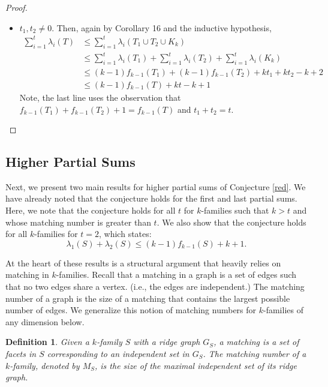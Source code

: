 \documentclass[11pt]{article}
\newtheorem{defi}[lm]{Definition}
\begin{document}
\begin{proof}
\begin{itemize}
\item[Case 2.] $t_1, t_2 \neq 0$. Then, again by Corollary 16 and the inductive hypothesis,
\begin{align*}
\sum_{i = 1}^t \lambda_i (T) &\leq \sum_{i = 1}^t \lambda_i(T_1 \cup T_2 \cup K_k)\\
& \leq \sum_{i = 1}^t \lambda_i(T_1) + \sum_{i = 1}^t \lambda_i(T_2) + \sum_{i = 1}^t \lambda_i(K_k)\\
& \leq (k - 1) f_{k - 1}(T_1) + (k - 1) f_{k - 1}(T_2) + k t_1 + k t_2 - k + 2\\
& \leq (k - 1) f_{k - 1}(T) + k t - k + 1
\end{align*}
Note, the last line uses the observation that $f_{k - 1}(T_1) + f_{k - 1}(T_2) + 1 = f_{k - 1}(T)$ and $t_1 + t_2 = t$.
\end{itemize}
\end{proof}



\subsection{Higher Partial Sums}\label{sec:hps}

Next, we present two main results for higher partial sums of Conjecture \ref{red}. We have already noted that the conjecture holds for the first and last partial sums. Here, we note that the conjecture holds for all $t$ for $k$-families such that $k > t$ and whose matching number is greater than $t$. We also show that the conjecture holds for all $k$-families for $ t = 2$, which states:
\[ \lambda_1(S) + \lambda_2(S) \leq (k - 1)f_{k - 1} (S) + k + 1.\]

At the heart of these results is a structural argument that heavily relies on matching in $k$-families. Recall that a matching in a graph is a set of edges such that no two edges share a vertex. (i.e., the edges are independent.) The matching number of a graph is the size of a matching that contains the largest possible number of edges. We generalize this notion of matching numbers for $k$-families of any dimension below.

\begin{defi}
Given a $k$-family $S$ with a ridge graph $G_S$, a \emph{matching} is a set of facets in $S$ corresponding to an independent set in $G_S$. The \emph{matching number} of a $k$-family, denoted by $M_S$, is the size of the maximal independent set of its ridge graph.
\end{defi}
\end{document}
